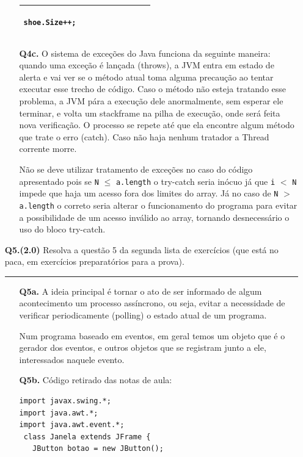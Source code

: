 \documentclass[11pt]{article}
\begin{document}
\begin{itemize}
\begin{itemize}
\begin{tabular}{|p{0.5\linewidth}|p{0.5\linewidth}|}
\begin{verbatim}
shoe.Size++; 
    \end{verbatim}
     \\ \hline
    
    \end{tabular}

    \item[{\bf Q4c.}] O sistema de exceções do Java funciona da seguinte
    maneira: quando uma exceção é lançada (throws), a JVM entra em estado de
    alerta e vai ver se o método atual toma alguma precaução ao tentar executar
    esse trecho de código. Caso o método não esteja tratando esse
    problema, a JVM pára a execução dele anormalmente, sem esperar ele terminar,
    e volta um stackframe na pilha de execução, onde será feita nova
    verificação. O processo se repete até que ela encontre algum método que
    trate o erro (catch). Caso não haja nenhum tratador a Thread corrente morre.
    \cite{caelum:apostila}
    
    Não se deve utilizar tratamento de exceções no caso do código apresentado
    pois se \texttt{N} $\leq$ \texttt{a.length} o try-catch seria inócuo já que
    \texttt{i} $<$ \texttt{N} impede que haja um acesso fora dos limites do
    array. Já no caso de \texttt{N} $>$ \texttt{a.length} o correto seria
    alterar o funcionamento do programa para evitar a possibilidade de um acesso
    inválido ao array, tornando desnecessário o uso do bloco try-catch.
\end{itemize}

\newpage

\item[{\bf Q5.(2.0)}] Resolva a questão 5 da segunda lista de exercícios (que está no paca, 
em exercícios preparatórios para a prova).

  \hrule
  \begin{itemize}
    \item[{\bf Q5a.}]
    A ideia principal é tornar o ato de ser informado de algum
    acontecimento um processo assíncrono, ou seja, evitar a necessidade de
    verificar periodicamente (polling) o estado atual de um programa.

    Num programa baseado em eventos, em geral temos um objeto que é o gerador
    dos eventos, e outros objetos que se registram junto a ele, interessados
    naquele evento.

    \item[{\bf Q5b.}]
    Código retirado das notas de aula:
\begin{verbatim}
import javax.swing.*;
import java.awt.*;
import java.awt.event.*;
 class Janela extends JFrame {
   JButton botao = new JButton();


\end{verbatim}
\end{itemize}
\end{itemize}
\end{document}
